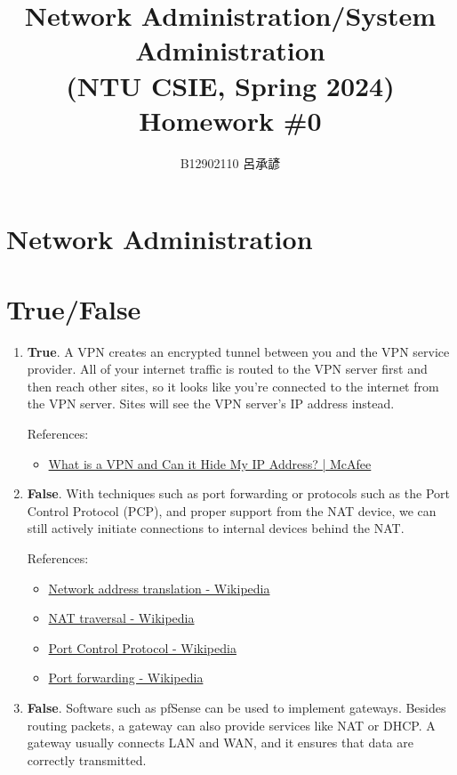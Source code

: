 \documentclass[12pt, a4paper]{article}
\title{
  Network Administration/System Administration\\
  (NTU CSIE, Spring 2024)\\
  Homework \#0
}
\author{\Large B12902110 呂承諺}
\date{}
\begin{document}
  \maketitle
  \section*{Network Administration}
  \section{True/False}
  \begin{enumerate}
    \item \textbf{True}. A VPN creates an encrypted tunnel between you and the
      VPN service provider. All of your internet traffic is routed to the VPN
      server first and then reach other sites, so it looks like you're connected
      to the internet from the VPN server. Sites will see the VPN server's IP
      address instead.

      References:
      \begin{itemize}
        \item \href{https://www.mcafee.com/learn/what-is-a-vpn-and-can-it-hide-my-ip-address/}{What is a VPN and Can it Hide My IP Address? | McAfee}
      \end{itemize}

    \item \textbf{False}. With techniques such as port forwarding or protocols
      such as the Port Control Protocol (PCP), and proper support from the NAT
      device, we can still actively initiate connections to internal devices
      behind the NAT.

      References:
      \begin{itemize}
        \item \href{https://en.wikipedia.org/wiki/Network_address_translation}{Network address translation - Wikipedia}
        \item \href{https://en.wikipedia.org/wiki/NAT_traversal}{NAT traversal - Wikipedia}
        \item \href{https://en.wikipedia.org/wiki/Port_Control_Protocol}{Port Control Protocol - Wikipedia}
        \item \href{https://en.wikipedia.org/wiki/Port_forwarding}{Port forwarding - Wikipedia}
      \end{itemize}

    \item \textbf{False}. Software such as pfSense can be used to implement
      gateways. Besides routing packets, a gateway can also provide services
      like NAT or DHCP. A gateway usually connects LAN and WAN, and it ensures
      that data are correctly transmitted.


\end{enumerate}
\end{document}
